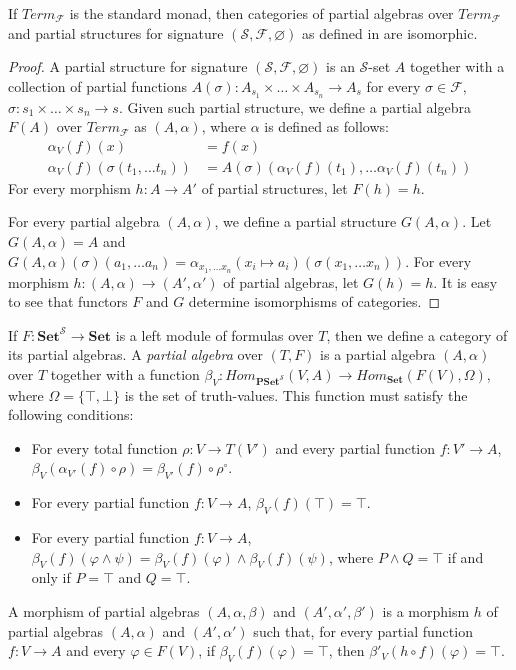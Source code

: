 \documentclass[reqno]{amsart}
\theoremstyle{definition}
\theoremstyle{remark}
\newcommand{\cat}[1]{\mathbf{#1}}
\newcommand{\Set}{\cat{Set}}
\newcommand{\PSet}{\cat{PSet}}
\numberwithin{figure}{section}
\begin{document}
\begin{lem}
If $Term_\mathcal{F}$ is the standard monad, then categories of partial algebras over $Term_\mathcal{F}$
    and partial structures for signature $(\mathcal{S},\mathcal{F},\varnothing)$ as defined in \cite{PHL} are isomorphic.
\end{lem}
\begin{proof}
A partial structure for signature $(\mathcal{S},\mathcal{F},\varnothing)$ is an $\mathcal{S}$-set $A$ together with a collection of partial functions
    $A(\sigma) : A_{s_1} \times \ldots \times A_{s_n} \to A_s$ for every $\sigma \in \mathcal{F}$, $\sigma : s_1 \times \ldots \times s_n \to s$.
Given such partial structure, we define a partial algebra $F(A)$ over $Term_\mathcal{F}$ as $(A,\alpha)$, where $\alpha$ is defined as follows:
\begin{align*}
\alpha_V(f)(x) & = f(x) \\
\alpha_V(f)(\sigma(t_1, \ldots t_n)) & = A(\sigma)(\alpha_V(f)(t_1), \ldots \alpha_V(f)(t_n))
\end{align*}
For every morphism $h : A \to A'$ of partial structures, let $F(h) = h$.

For every partial algebra $(A,\alpha)$, we define a partial structure $G(A,\alpha)$.
Let $G(A,\alpha) = A$ and $G(A,\alpha)(\sigma)(a_1, \ldots a_n) = \alpha_{x_1, \ldots x_n}(x_i \mapsto a_i)(\sigma(x_1, \ldots x_n))$.
For every morphism $h : (A,\alpha) \to (A',\alpha')$ of partial algebras, let $G(h) = h$.
It is easy to see that functors $F$ and $G$ determine isomorphisms of categories.
\end{proof}

If $F : \Set^\mathcal{S} \to \Set$ is a left module of formulas over $T$, then we define a category of its partial algebras.
A \emph{partial algebra} over $(T,F)$ is a partial algebra $(A,\alpha)$ over $T$ together with a function $\beta_V : Hom_{\PSet^\mathcal{S}}(V,A) \to Hom_\Set(F(V),\Omega)$,
    where $\Omega = \{ \top, \bot \}$ is the set of truth-values.
This function must satisfy the following conditions:
\begin{itemize}
\item For every total function $\rho : V \to T(V')$ and every partial function $f : V' \to A$, $\beta_V(\alpha_{V'}(f) \circ \rho) = \beta_{V'}(f) \circ \rho^\circ$.
\item For every partial function $f : V \to A$, $\beta_V(f)(\top) = \top$.
\item For every partial function $f : V \to A$, $\beta_V(f)(\varphi \land \psi) = \beta_V(f)(\varphi) \land \beta_V(f)(\psi)$,
    where $P \land Q = \top$ if and only if $P = \top$ and $Q = \top$.
\end{itemize}
A morphism of partial algebras $(A,\alpha,\beta)$ and $(A',\alpha',\beta')$ is a morphism $h$ of partial algebras $(A,\alpha)$ and $(A',\alpha')$
    such that, for every partial function $f : V \to A$ and every $\varphi \in F(V)$, if $\beta_V(f)(\varphi) = \top$, then $\beta'_V(h \circ f)(\varphi) = \top$.
\end{document}
